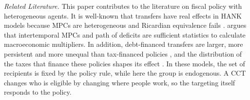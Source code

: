 \documentclass[12pt]{article}
\begin{document}
\textit{Related Literature.} This paper contributes to the literature on fiscal policy
with heterogeneous agents. It is well-known that transfers have real effects in HANK
models because MPCs are heterogeneous and Ricardian equivalence fails
\parencite{kaplan2014model,kaplan2018monetary,auclert2025fiscal}.
\textcite{auclert2024intertemporal} argues that intertemporal MPCs and path of deficits
are sufficient statistics to calculate macroeconomic multipliers. In addition,
debt-financed transfers are larger, more persistent and more unequal than tax-financed
policies \parencite{auclert2023trickling,angeletos2024can}, and the distribution of the
taxes that finance these policies shapes its effect \parencite{auclert2018inequality,
ferriere2025heterogeneous,bartal2024consumption}. In these models, the set of recipients
is fixed by the policy rule, while here the group is endogenous. A CCT changes who is
eligible by changing where people work, so the targeting itself responds to the policy.


\end{document}
